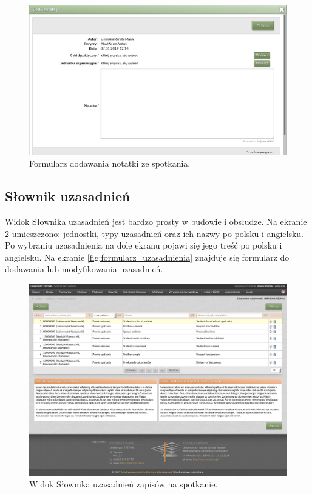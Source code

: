 \documentclass[licencjacka]{pracamgr}
\begin{document}
\begin{figure}[!]
  \includegraphics[width=\linewidth]{formularz_notatek.jpg}
  \caption{Formularz dodawania notatki ze spotkania.}
  \label{fig:formularz_notatek}
\end{figure}

\subsection{Słownik uzasadnień}
Widok Słownika uzasadnień jest bardzo prosty w budowie i obsłudze. Na ekranie \ref{fig:uzasadnienia} umieszczono: jednostki, typy uzasadnień oraz ich nazwy po polsku i angielsku. Po wybraniu uzasadnienia na dole ekranu pojawi się jego treść po polsku i angielsku.
Na ekranie \ref{fig:formularz_uzasadnienia} znajduje się formularz do dodawania lub modyfikowania uzasadnień.

\begin{figure}[!]
  \includegraphics[width=\linewidth]{widok_uzasadnien.jpg}
  \caption{Widok Słownika uzasadnień zapisów na spotkanie.}
  \label{fig:uzasadnienia}
\end{figure}
\end{document}
